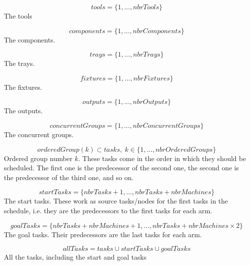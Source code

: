 \documentclass[10pt,a4paper]{report}
\begin{document}
\begin{equation}\label{eq:12}
tools = \{1 , \ldots , nbrTools\}\end{equation}
The tools

\begin{equation}\label{eq:13}
components = \{1 , \ldots , nbrComponents\}\end{equation}
The components.

\begin{equation}\label{eq:14}
trays = \{1 , \ldots , nbrTrays\}\end{equation}
The trays.

\begin{equation}\label{eq:15}
fixtures = \{1 , \ldots , nbrFixtures\}\end{equation}
The fixtures.

\begin{equation}\label{eq:16}
outputs = \{1 , \ldots , nbrOutputs\}\end{equation}
The outputs.

\begin{equation}\label{eq:17}
concurrentGroups = \{1 , \ldots , nbrConcurrentGroups\}\end{equation}
The concurrent groups.

\begin{equation}\label{eq:18}
orderedGroup(k) \subset tasks, \; k \in \{1 , \ldots , nbrOrderedGroups\}\end{equation}
Ordered group number $k$. These tasks come in the order in which they should be scheduled. The first one is the predecessor of the second one, the second one is the predecessor of the third one, and so on.

\begin{equation}\label{eq:19}
startTasks = \{nbrTasks+1 , \ldots , nbrTasks+nbrMachines\}\end{equation}
The start tasks. These work as source tasks/nodes for the first tasks in the schedule, i.e. they are the predecessors to the first tasks for each arm.

\begin{equation}\label{eq:20}
goalTasks = \{nbrTasks+nbrMachines+1 , \ldots , nbrTasks+nbrMachines \times 2\}\end{equation}
The goal tasks. Their predecessors are the last tasks for each arm.

\begin{equation}\label{eq:21}
allTasks = tasks \cup startTasks \cup goalTasks\end{equation}
All the tasks, including the start and goal tasks
\end{document}

